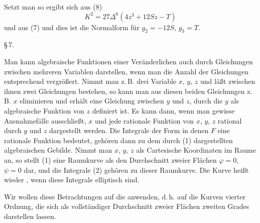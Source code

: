 Setzt man
so ergibt sich aus (8)
\[
K^2 = 27\Delta^6(4z^3+12Sz-T)
\]
und aus (7)
und dies ist die  Normalform für $g_2=-12S$,
$g_3=T$.

\begin{center}
\S\,7. 
\end{center}

Man kann algebraische Funktionen einer Veränderlichen auch
durch Gleichungen zwischen mehreren Variablen darstellen, wenn
man die Anzahl der Gleichungen entsprechend vergrößert. Nimmt
man z.\,B. drei Variable $x$, $y$, $z$ und läßt zwischen ihnen zwei
Gleichungen
bestehen, so kann man aus diesen beiden Gleichungen z.\,B. $x$
eliminieren und erhält eine Gleichung zwischen $y$ und $z$, durch
die $y$ als algebraische Funktion von $z$ definiert ist. Es kann
dann, wenn man gewisse Ausnahmefälle ausschließt, $x$ und jede
rationale Funktion von $x$, $y$, $z$ rational durch $y$ und $z$ dargestellt
werden. Die Integrale der Form
in denen $F$ eine rationale Funktion bedeutet, gehören dann zu
dem durch (1) dargestellten algebraischen Gebilde. Nimmt man
$x$, $y$, $z$ als Cartesische Koordinaten im Raume an, so stellt (1)
eine Raumkurve als den Durchschnitt zweier Flächen $\varphi=0$,
$\psi=0$ dar, und die Integrale (2) gehören zu dieser Raumkurve.
Die Kurve heißt wieder , wenn diese Integrale elliptisch sind.

Wir wollen diese Betrachtungen auf die  anwenden, d.\,h. auf die Kurven vierter
Ordnung, die sich als vollständiger Durchschnitt zweier Flächen
zweiten Grades darstellen lassen.
